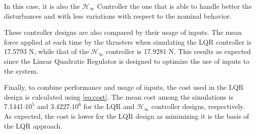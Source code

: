 In this case, it is also the $\mathcal{H}_\infty$ Controller the one that is able to handle better the disturbances and with less variations with respect to the nominal behavior.

These controller designs are also compared by their usage of inputs. The mean force applied at each time by the thrusters when simulating the LQR controller is \num{17.5793} N, while that of the $\mathcal{H}_\infty$ controller is \num{17.9281} N. This results as expected since the Linear Quadratic Regulator is designed to optimize the use of inputs to the system.

Finally, to combine performance and usage of inputs, the cost used in the LQR design is calculated using \autoref{eq:cost}. The mean cost among the simulations is \num{7.1441}$\cdot 10^5$ and \num{3.4227}$\cdot 10^6$ for the LQR and $\mathcal{H}_\infty$ controller designs, respectively. As expected, the cost is lower for the LQR design as minimizing it is the basis of the LQR approach.



